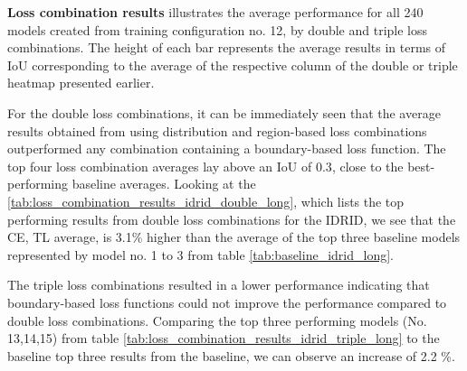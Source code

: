 \textbf{Loss combination results}\newline
{} illustrates the average performance for all 240 models created from training configuration no. 12, by double and triple loss combinations. The height of each bar represents the average results in terms of \ac{IoU} corresponding to the average of the respective column of the double or triple heatmap presented earlier. 

For the double loss combinations, it can be immediately seen that the average results obtained from using distribution and region-based loss combinations outperformed any combination containing a boundary-based loss function. The top four loss combination averages lay above an \ac{IoU} of $0.3$, close to the best-performing baseline averages. Looking at the \ref{tab:loss_combination_results_idrid_double_long}, which lists the top performing results from double loss combinations for the \ac{IDRID}, we see that the CE, TL average, is 3.1\% higher than the average of the top three baseline models represented by model no. 1 to 3 from table \ref{tab:baseline_idrid_long}.

The triple loss combinations resulted in a lower performance indicating that boundary-based loss functions could not improve the performance compared to double loss combinations. Comparing the top three performing models (No. 13,14,15) from table \ref{tab:loss_combination_results_idrid_triple_long} to the baseline top three results from the baseline, we can observe an increase of 2.2 \%.

